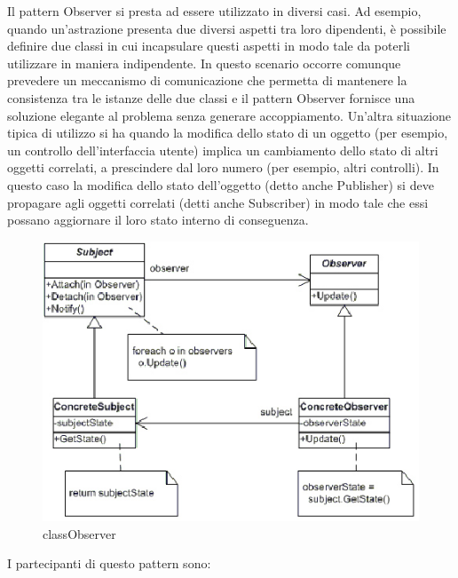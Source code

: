 \documentclass[a4paper,10pt]{article}
\begin{document}
                            Il pattern Observer si presta ad essere utilizzato in diversi casi. Ad esempio, quando un’astrazione presenta due diversi aspetti tra loro dipendenti, è possibile definire due classi in cui incapsulare questi aspetti in modo tale da poterli utilizzare in maniera indipendente. In questo scenario occorre comunque prevedere un meccanismo di comunicazione che permetta di mantenere la consistenza tra le istanze delle due classi e il pattern Observer fornisce una soluzione elegante al problema senza generare accoppiamento. Un’altra situazione tipica di utilizzo si ha quando la modifica dello stato di un oggetto (per esempio, un controllo dell’interfaccia utente) implica un cambiamento dello stato di altri oggetti correlati, a prescindere dal loro numero (per esempio, altri controlli). In questo caso la modifica dello stato dell’oggetto (detto anche Publisher) si deve propagare agli oggetti correlati (detti anche Subscriber) in modo tale che essi possano aggiornare il loro stato interno di conseguenza.
    
                            \begin{figure}[h!] %
                                \centering
                                \includegraphics[scale=0.50]{img/IC68568}
                                \caption{classObserver}
                            \end{figure}
                            I partecipanti di questo pattern sono:
                                
\end{document}
